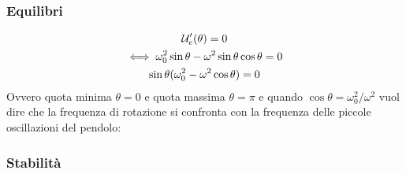 \documentclass[Main.tex]{subfiles}
\begin{document}
\begin{tema}
	\subsubsection*{Equilibri}
	\begin{gather}
		\mathcal{U}'_e(\theta) =0\\
		\iff \omega_0^2 \sin \theta - \omega^2 \sin \theta \cos \theta =0\\
		\sin \theta (\omega_0^2 - \omega^2 \cos \theta )=0
	\end{gather}
	Ovvero quota minima $\theta = 0$ e quota massima $\theta= \pi$ e quando $\cos \theta = \omega_0^2/ \omega^2$ vuol dire che la frequenza di rotazione si confronta con la frequenza delle piccole oscillazioni del pendolo:
	
	\subsubsection*{Stabilità}
	
\end{tema}
\end{document}
